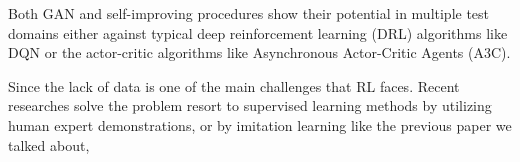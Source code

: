  Both GAN and self-improving procedures show their potential in multiple test domains either against typical deep reinforcement learning (DRL) algorithms like DQN or the actor-critic algorithms like 
 Asynchronous Actor-Critic Agents (A3C).

Since the lack of data is one of the main challenges that RL faces. Recent researches solve the problem resort to supervised learning methods by utilizing human expert demonstrations, or by imitation learning like the previous paper we talked about,
\clearpage{\pagestyle{empty}\cleardoublepage}